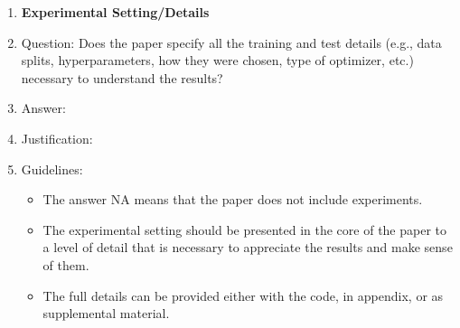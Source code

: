 \documentclass{article}
\begin{document}
\begin{enumerate}
\item {\bf Experimental Setting/Details}
    \item[] Question: Does the paper specify all the training and test details (e.g., data splits, hyperparameters, how they were chosen, type of optimizer, etc.) necessary to understand the results?
    \item[] Answer: \answerTODO{} %
    \item[] Justification: \justificationTODO{}
    \item[] Guidelines:
    \begin{itemize}
        \item The answer NA means that the paper does not include experiments.
        \item The experimental setting should be presented in the core of the paper to a level of detail that is necessary to appreciate the results and make sense of them.
        \item The full details can be provided either with the code, in appendix, or as supplemental material.
    \end{itemize}


\end{enumerate}
\end{document}
